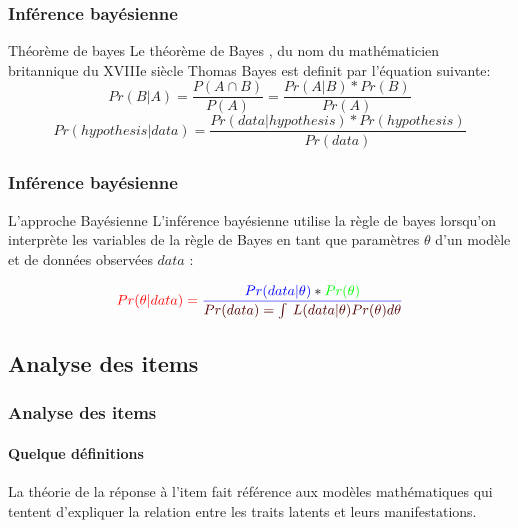 \documentclass[aspectratio=169,professionalfonts, 12pt]{beamer}
\begin{document}
\begin{frame}
  \frametitle{Inférence bayésienne}
  \justifying 
  \begin{minipage}{\textwidth}
  \begin{block}{Théorème de bayes}
    Le théorème de Bayes , du nom du mathématicien britannique du XVIIIe siècle Thomas Bayes est definit par l'équation suivante:   
    \begin{equation}
      Pr(B|A) = \frac{P(A\cap B)}{P(A)} = \frac{Pr(A|B)*Pr(B)}{Pr(A)}
      \label{theoreme_bayes}
    \end{equation} 
    \begin{equation}
      Pr(hypothesis|data) = \frac{Pr(data|hypothesis)*Pr(hypothesis)}{Pr(data)}
      \label{theoreme_bayes2}
    \end{equation}
  \end{block}
  \end{minipage} 
\end{frame}


\begin{frame}
  \frametitle{Inférence bayésienne}
  \justifying 
  \begin{minipage}{\textwidth}
  \begin{block}{L’approche Bayésienne}
    L'inférence bayésienne utilise la règle de bayes lorsqu’on interprète les variables de la règle de Bayes en tant que paramètres \(\displaystyle \theta \) d'un modèle et de données observées \(\displaystyle data \) : 
  \end{block}
  \end{minipage}
  \begin{minipage}{\textwidth}
    \centering
    \begin{equation}
      \color{red} Pr(\theta|data) = \color{blue} \frac{Pr(data|\theta)\color{black} * \color{green}Pr(\theta)}{ \color{blueforest} Pr(data) =  \int_{}^{}  \,L(data|\theta)Pr(\theta)d\theta }
      \label{theoreme_bayes3}
    \end{equation}
  \end{minipage}
\end{frame}

\subsection{Analyse des items}

\begin{frame}
  \frametitle{Analyse des items}
  \framesubtitle{Quelque définitions}
  \justifying 
  \begin{minipage}{\textwidth}
  \begin{block}{}
    La théorie de la réponse à l'item fait référence aux modèles mathématiques qui tentent d'expliquer la relation entre les traits latents et leurs manifestations.
  \end{block}


  \end{minipage} 
\end{frame}
\end{document}
